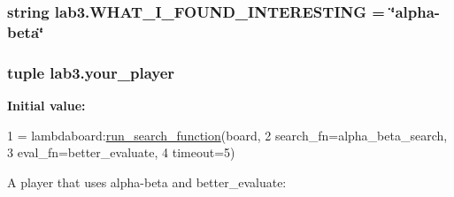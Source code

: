 \subsubsection[{W\+H\+A\+T\+\_\+\+I\+\_\+\+F\+O\+U\+N\+D\+\_\+\+I\+N\+T\+E\+R\+E\+S\+T\+I\+N\+G}]{\setlength{\rightskip}{0pt plus 5cm}string lab3.\+W\+H\+A\+T\+\_\+\+I\+\_\+\+F\+O\+U\+N\+D\+\_\+\+I\+N\+T\+E\+R\+E\+S\+T\+I\+N\+G = \char`\"{}alpha-\/beta\char`\"{}}\label{namespacelab3_ac6298332137ba3ffbfa88449a0d8add2}
\hypertarget{namespacelab3_abb9fde36d4d3f3fbe09a1bcc9e70a8df}{}
\subsubsection[{your\+\_\+player}]{\setlength{\rightskip}{0pt plus 5cm}tuple lab3.\+your\+\_\+player}\label{namespacelab3_abb9fde36d4d3f3fbe09a1bcc9e70a8df}
{\bfseries Initial value\+:}
\begin{DoxyCode}
1 = lambdaboard:\hyperlink{namespaceutil_ab8b35c47eb1a77e7a3f61851a1b46122}{run\_search\_function}(board,
2                                                 search\_fn=alpha\_beta\_search,
3                                                 eval\_fn=better\_evaluate,
4                                                 timeout=5)
\end{DoxyCode}


A player that uses alpha-\/beta and better\+\_\+evaluate\+: 

